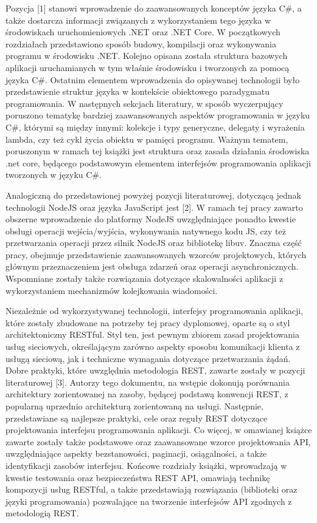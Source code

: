 Pozycja [1] stanowi wprowadzenie do zaawansowanych konceptów języka C\#, a także dostarcza informacji związanych z wykorzystaniem tego języka w środowiskach uruchomieniowych .NET oraz .NET Core. W początkowych rozdziałach przedstawiono sposób budowy, kompilacji oraz wykonywania programu w środowisku .NET. Kolejno opisana została struktura bazowych aplikacji uruchamianych w tym właśnie środowisku i tworzonych za pomocą języka C\#. Ostatnim elementem wprowadzenia do opisywanej technologii było przedstawienie struktur języka w kontekście obiektowego paradygmatu programowania.    W następnych sekcjach literatury, w sposób wyczerpujący poruszono tematykę bardziej zaawansowanych aspektów programowania w języku C\#, którymi są między innymi: kolekcje i typy generyczne, delegaty i wyrażenia lambda, czy też cykl życia obiektu w pamięci programu. Ważnym tematem, poruszonym w ramach tej książki jest struktura oraz zasada działania środowiska .net core, będącego podstawowym elementem interfejsów programowania aplikacji tworzonych w języku C\#.

Analogiczną do przedstawionej powyżej pozycji literaturowej, dotyczącą jednak technologii NodeJS oraz języka JavaScript jest [2]. W ramach tej pracy zawarto obszerne wprowadzenie do platformy NodeJS uwzględniające ponadto kwestie obsługi operacji wejścia/wyjścia, wykonywania natywnego kodu JS, czy też przetwarzania operacji przez silnik NodeJS oraz bibliotekę libuv. Znaczna część pracy, obejmuje przedstawienie zaawansowanych wzorców projektowych, których głównym przeznaczeniem jest obsługa zdarzeń oraz operacji asynchronicznych. Wspomniane zostały także rozwiązania dotyczące skalowalności aplikacji z wykorzystaniem mechanizmów kolejkowania wiadomości.

Niezależnie od wykorzystywanej technologii, interfejsy programowania aplikacji, które zostały zbudowane na potrzeby tej pracy dyplomowej, oparte są o styl architektoniczny RESTful. Styl ten, jest pewnym zbiorem zasad projektowania usług sieciowych, określającym zarówno aspekty sposobu komunikacji klienta z usługą sieciową, jak i techniczne wymagania dotyczące przetwarzania żądań. Dobre praktyki, które uwzględnia metodologia REST, zawarte zostały w pozycji literaturowej [3]. Autorzy tego dokumentu, na wstępie dokonują porównania architektury zorientowanej na zasoby, będącej podstawą konwencji REST, z popularną uprzednio architekturą zorientowaną na usługi. Następnie, przedstawiane są najlepsze praktyki, cele oraz reguły REST dotyczące projektowania interfejsu programowania aplikacji. Co więcej, w omawianej książce zawarte zostały także podstawowe oraz zaawansowane wzorce projektowania API, uwzględniające aspekty bezstanowości, paginacji, osiągalności, a także identyfikacji zasobów interfejsu. Końcowe rozdziały książki, wprowadzają w kwestie testowania oraz bezpieczeństwa REST API, omawiają technikę kompozycji usług RESTful, a także przedstawiają rozwiązania (biblioteki oraz języki programowania) pozwalające na tworzenie interfejsów API zgodnych z metodologią REST.


